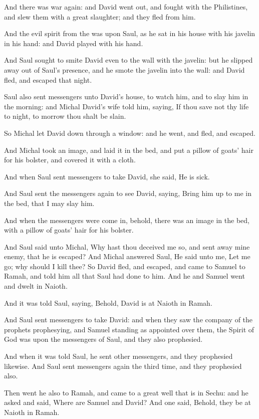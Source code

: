 \verse And there was war again: and David went out, and fought with the Philistines, and slew them with a great slaughter; and they fled from him.

\verse And the evil spirit from the \LORD was upon Saul, as he sat in his house with his javelin in his hand: and David played with his hand.

\verse And Saul sought to smite David even to the wall with the javelin: but he slipped away out of Saul's presence, and he smote the javelin into the wall: and David fled, and escaped that night.

\verse Saul also sent messengers unto David's house, to watch him, and to slay him in the morning: and Michal David's wife told him, saying, If thou save not thy life to night, to morrow thou shalt be slain.

\verse So Michal let David down through a window: and he went, and fled, and escaped.

\verse And Michal took an image, and laid it in the bed, and put a pillow of goats' hair for his bolster, and covered it with a cloth.

\verse And when Saul sent messengers to take David, she said, He is sick.

\verse And Saul sent the messengers again to see David, saying, Bring him up to me in the bed, that I may slay him.

\verse And when the messengers were come in, behold, there was an image in the bed, with a pillow of goats' hair for his bolster.

\verse And Saul said unto Michal, Why hast thou deceived me so, and sent away mine enemy, that he is escaped? And Michal answered Saul, He said unto me, Let me go; why should I kill thee?  \verse So David fled, and escaped, and came to Samuel to Ramah, and told him all that Saul had done to him. And he and Samuel went and dwelt in Naioth.

\verse And it was told Saul, saying, Behold, David is at Naioth in Ramah.

\verse And Saul sent messengers to take David: and when they saw the company of the prophets prophesying, and Samuel standing as appointed over them, the Spirit of God was upon the messengers of Saul, and they also prophesied.

\verse And when it was told Saul, he sent other messengers, and they prophesied likewise. And Saul sent messengers again the third time, and they prophesied also.

\verse Then went he also to Ramah, and came to a great well that is in Sechu: and he asked and said, Where are Samuel and David? And one said, Behold, they be at Naioth in Ramah.

